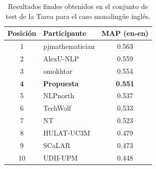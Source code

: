 \begin{table}[ht!]
    \centering
    \begin{tabular}{clc}
        \hline
        \textbf{Posición} & \textbf{Participante} & \textbf{MAP (en-en)} \\ \hline
        1                 & pjmathematician       & 0.563                \\ 
        2                 & AlexU-NLP             & 0.559                \\ 
        3                 & omokhtar              & 0.554                \\ 
        \textbf{4}        & \textbf{Propuesta}    & \textbf{0.551}       \\
        5                 & NLPnorth              & 0.537                \\ 
        6                 & TechWolf              & 0.533                \\ 
        7                 & NT                    & 0.523                \\ 
        8                 & HULAT-UC3M            & 0.479                \\
        9                 & SCaLAR                & 0.473                \\
        10                & UDII-UPM              & 0.448                \\ \hline
    \end{tabular}
    \caption{Resultados finales obtenidos en el conjunto de test de la \gls{Tarea} para el caso monolingüe inglés.}
    \label{tab:final_results_test_en}
\end{table}


